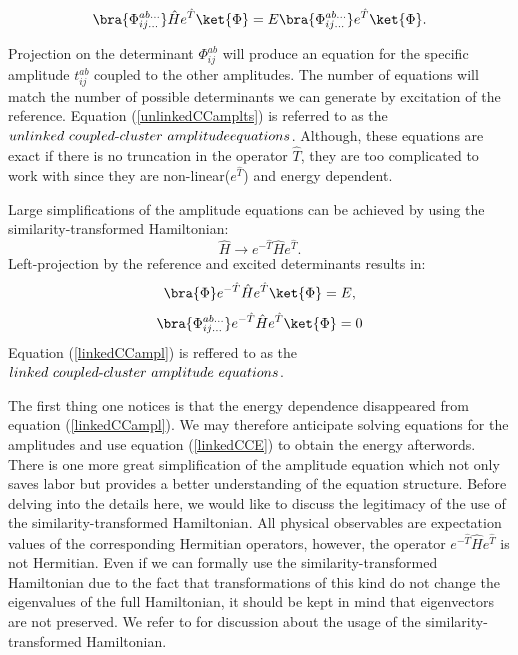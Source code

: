 \documentclass[twoside,english]{uiofysmaster}
\begin{document}
\begin{equation}\label{unlinkedCCE}
\bra{\Phi_{ij\dots}^{ab\dots}}\hat{H}e^{\hat{T}}\ket{\Phi} = E\bra{\Phi_{ij\dots}^{ab\dots}}e^{\hat{T}}\ket{\Phi}.
\end{equation}

Projection on the determinant ${\Phi_{ij}^{ab}}$ will produce an
equation for the specific amplitude ${t_{ij}^{ab}}$ coupled to the
other amplitudes. The number of equations will match the number of
possible determinants we can generate by excitation of the
reference. Equation (\ref{unlinkedCCamplts}) is referred to as the
$unlinked\ coupled{\text -}cluster\ amplitude\\ equations$. Although,
these equations are exact if there is no truncation in the operator
$\hat{T}$, they are too complicated to work with since they are
non-linear($e^{\hat{T}}$) and energy dependent.

Large simplifications of the amplitude equations can be achieved by using the  similarity-transformed Hamiltonian: 
\[
\hat{H} \rightarrow e^{-\hat{T}}\hat{H}e^{\hat{T}}.
\]
Left-projection by the reference and excited determinants results in:
\begin{equation}\label{linkedCCE}
\bra{\Phi}e^{-\hat{T}}\hat{H}e^{\hat{T}}\ket{\Phi} = E,
\end{equation}
\begin{equation}\label{linkedCCampl}
\bra{\Phi_{ij\dots}^{ab\dots}}e^{-\hat{T}}\hat{H}e^{\hat{T}}\ket{\Phi} = 0
\end{equation}
Equation (\ref{linkedCCampl}) is reffered to as the $linked\ coupled{\text -}cluster\ amplitude\ equations$.


The first thing one notices is that the energy dependence 
disappeared from equation (\ref{linkedCCampl}).  We may therefore
anticipate solving equations for the amplitudes and use equation
(\ref{linkedCCE}) to obtain the energy afterwords.  There is one more
great simplification of the amplitude equation which not only saves
labor but provides a better understanding of the equation
structure. Before delving into the details here, we would like to
discuss the legitimacy of the use of the similarity-transformed
Hamiltonian. All physical observables are expectation values of the
corresponding Hermitian operators, however, the operator
$e^{-\hat{T}}\hat{H}e^{\hat{T}}$ is not Hermitian.  Even if we can
formally use the similarity-transformed Hamiltonian due to the fact
that transformations of this kind do not change the eigenvalues of the
full Hamiltonian, it should be kept in mind that eigenvectors are not
preserved. We refer to \cite{Stantonequationmotioncoupled1993} for
discussion about the usage of the similarity-transformed Hamiltonian.
\end{document}
